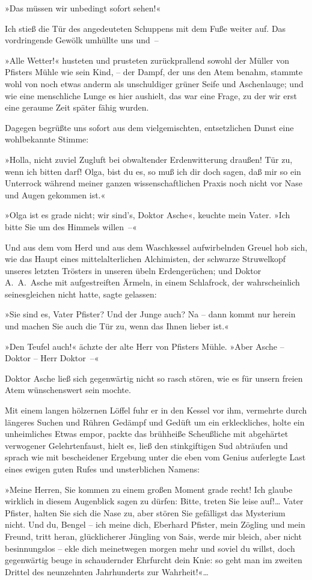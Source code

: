 »Das müssen wir unbedingt sofort sehen!«

Ich stieß die Tür des angedeuteten Schuppens mit dem Fuße weiter
auf. Das vordringende Gewölk umhüllte uns und~–

»Alle Wetter!« husteten und prusteten zurückprallend sowohl der
Müller von Pfisters Mühle wie sein Kind, – der Dampf, der uns den
Atem benahm, stammte wohl von noch etwas anderm als unschuldiger
grüner Seife und Aschenlauge; und wie eine menschliche Lunge es
hier aushielt, das war eine Frage, zu der wir erst eine geraume
Zeit später fähig wurden.

Dagegen begrüßte uns sofort aus dem vielgemischten, entsetzlichen
Dunst eine wohlbekannte Stimme:

»Holla, nicht zuviel Zugluft bei obwaltender Erdenwitterung
draußen! Tür zu, wenn ich bitten darf! Olga, bist du es, so muß ich
dir doch sagen, daß mir so ein Unterrock während meiner ganzen
wissenschaftlichen Praxis noch nicht vor Nase und Augen gekommen
ist.«

»Olga ist es grade nicht; wir sind's, Doktor Asche«, keuchte mein
Vater. »Ich bitte Sie um des Himmels willen~–«

Und aus dem vom Herd und aus dem Waschkessel aufwirbelnden Greuel
hob sich, wie das Haupt eines mittelalterlichen Alchimisten, der
schwarze Struwelkopf unseres letzten Trösters in unseren übeln
Erdengerüchen; und Doktor A.~A.~Asche mit aufgestreiften Ärmeln, in
einem Schlafrock, der wahrscheinlich seinesgleichen nicht hatte,
sagte gelassen:

»Sie sind es, Vater Pfister? Und der Junge auch? Na – dann kommt
nur herein und machen Sie auch die Tür zu, wenn das Ihnen lieber
ist.«

»Den Teufel auch!« ächzte der alte Herr von Pfisters Mühle. »Aber
Asche – Doktor – Herr Doktor~–«

Doktor Asche ließ sich gegenwärtig nicht so rasch stören, wie es
für unsern freien Atem wünschenswert sein mochte.

Mit einem langen hölzernen Löffel fuhr er in den Kessel vor ihm,
vermehrte durch längeres Suchen und Rühren Gedämpf und Gedüft um
ein erkleckliches, holte ein unheimliches Etwas empor, packte das
brühheiße Scheußliche mit abgehärtet verwogener Gelehrtenfaust,
hielt es, ließ den stinkgiftigen Sud abträufen und sprach wie mit
bescheidener Ergebung unter die eben vom Genius auferlegte Last
eines ewigen guten Rufes und unsterblichen Namens:

»Meine Herren, Sie kommen zu einem großen Moment grade recht! Ich
glaube wirklich in diesem Augenblick sagen zu dürfen: Bitte, treten
Sie leise auf!\ldots{} Vater Pfister, halten Sie sich die Nase zu, aber
stören Sie gefälligst das Mysterium nicht. Und du, Bengel – ich
meine dich, Eberhard Pfister, mein Zögling und mein Freund, tritt
heran, glücklicherer Jüngling von Sais, werde mir bleich, aber
nicht besinnungslos – ekle dich meinetwegen morgen mehr und soviel
du willst, doch gegenwärtig beuge in schaudernder Ehrfurcht dein
Knie: so geht man im zweiten Drittel des neunzehnten Jahrhunderts
zur Wahrheit!«\ldots{}

